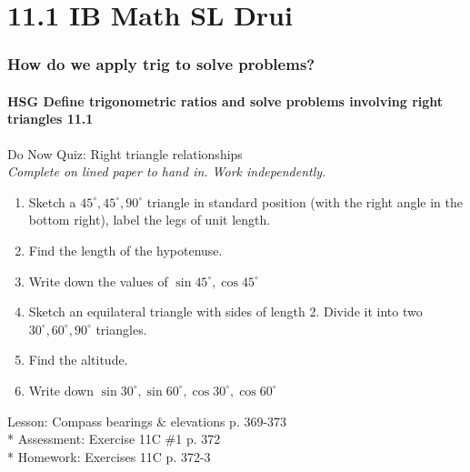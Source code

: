 \documentclass{beamer}
\begin{document}
  \section{11.1 IB Math SL Drui}
  \frame
  {
    \frametitle{How do we apply trig to solve problems?}
    \framesubtitle{HSG Define trigonometric ratios and solve problems involving right triangles \qquad \alert{11.1}}

  \begin{block}{Do Now Quiz: Right triangle relationships\\
      \emph{Complete on lined paper to hand in. Work independently.}}
    \begin{enumerate}
      \item Sketch a $45^\circ, 45^\circ, 90^\circ$ triangle in standard position (with the right angle in the bottom right), label the legs of unit length.
      \item Find the length of the hypotenuse.
      \item Write down the values of $\sin{45^\circ}, \cos{45^\circ}$
      \item Sketch an equilateral triangle with sides of length 2. Divide it into two $30^\circ, 60^\circ, 90^\circ$ triangles.
      \item Find the altitude.
      \item Write down $\sin{30^\circ}, \sin{60^\circ}, \cos{30^\circ}, \cos{60^\circ}$
      \end{enumerate}
    \end{block}
    Lesson: Compass bearings \& elevations p. 369-373\\*
    Assessment: Exercise 11C \#1 p. 372\\*
    Homework: Exercises 11C p. 372-3\\
  }
\end{document}

